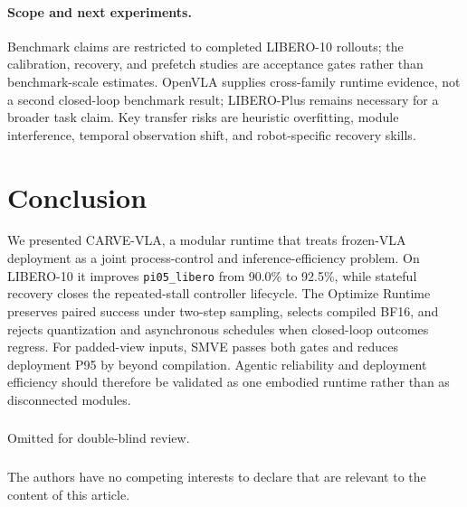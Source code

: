 \documentclass[runningheads]{waica}
\newcommand{\method}{CARVE-VLA}
\begin{document}
\paragraph{Scope and next experiments.}
Benchmark claims are restricted to completed LIBERO-10 rollouts; the
calibration, recovery, and prefetch studies are acceptance gates rather than
benchmark-scale estimates. OpenVLA supplies cross-family runtime evidence, not
a second closed-loop benchmark result; LIBERO-Plus remains necessary for a
broader task claim. Key transfer risks are heuristic overfitting, module
interference, temporal observation shift, and robot-specific recovery skills.

\section{Conclusion}
\label{sec:conclusion}

We presented \method{}, a modular runtime that treats frozen-VLA deployment as
a joint process-control and inference-efficiency problem. On LIBERO-10 it
improves \texttt{pi05\_libero} from 90.0\% to 92.5\%, while stateful recovery
closes the repeated-stall controller lifecycle. The Optimize Runtime preserves
paired success under two-step sampling, selects compiled BF16, and rejects
quantization and asynchronous schedules when closed-loop outcomes regress.
For padded-view inputs, SMVE passes both gates and reduces deployment P95 by
\CarveSmveRuntimeReduction{} beyond compilation.
Agentic reliability and deployment efficiency should therefore be validated as
one embodied runtime rather than as disconnected modules.

\begin{credits}
\subsubsection{\ackname}
Omitted for double-blind review.

\subsubsection{\discintname}
The authors have no competing interests to declare that are relevant to the content of this article.
\end{credits}



\end{document}
